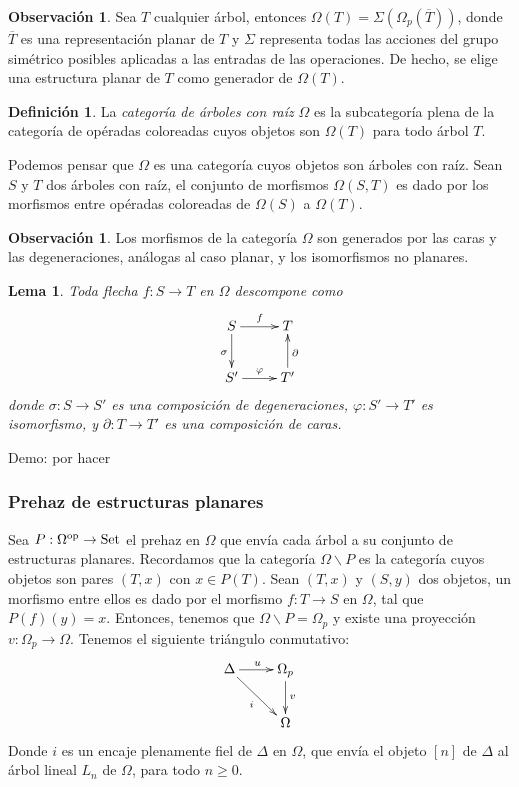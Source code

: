 \documentclass[11pt,a4paper,openright,oneside]{article}
\numberwithin{equation}{section}
\newtheorem{lema}[teo]{Lema}
\theoremstyle{definition}
\newtheorem{defi}[teo]{Definici\'on}
\newtheorem{obs}[teo]{Observaci\'on}
\newcommand{\Set}{\mathop{\rm Set}}
\begin{document}
\begin{obs}
    Sea $T$ cualquier \'arbol, entonces $\Omega(T) = \Sigma(\Omega_p(\overline{T}))$, donde $\overline{T}$ es una representaci\'on planar de $T$ y $\Sigma$ representa todas las acciones del grupo sim\'etrico posibles aplicadas a las entradas de las operaciones. De hecho, se elige una estructura planar de $T$ como generador de $\Omega(T)$.
\end{obs}
\begin{defi}
    La \emph{categor\'ia de \'arboles con ra\'iz} $\Omega$ es la subcategor\'ia plena de la categor\'ia de op\'eradas coloreadas cuyos objetos son $\Omega(T)$ para todo \'arbol $T$.

    Podemos pensar que $\Omega$ es una categor\'ia cuyos objetos son \'arboles con ra\'iz.
    Sean $S$ y $T$ dos \'arboles con ra\'iz, el conjunto de morfismos $\Omega(S, T)$ es dado por los morfismos entre op\'eradas coloreadas de $\Omega(S)$ a $\Omega(T)$.
\end{defi}
\begin{obs}
    Los morfismos de la categor\'ia $\Omega$ son generados por las caras y las degeneraciones, an\'alogas al caso planar, y los isomorfismos no planares.
\end{obs}
\begin{lema}
    Toda flecha $f\colon S \to T$ en $\Omega$ descompone como
    $$
        \xymatrix{
            S \ar[d]_{\sigma} \ar[r]^f
            &T \\
            S' \ar[r]^\varphi
            &T' \ar[u]_\partial
        }
    $$
    donde  $\sigma\colon S\to S'$ es una composici\'on de degeneraciones, $\varphi\colon S'\to T'$ es isomorfismo, y $\partial\colon T\to T'$ es una composici\'on de caras.
\end{lema}
Demo: por hacer

\subsubsection{Prehaz de estructuras planares}
Sea $P:\Omega^{\rm op} \to \Set$ el prehaz en $\Omega$ que env\'ia cada \'arbol a su conjunto de estructuras planares.
Recordamos que la categor\'ia $\Omega\backslash P$ es la categor\'ia cuyos objetos son pares $(T,x)$ con $x\in P(T)$. Sean $(T,x)$ y $(S,y)$ dos objetos, un morfismo entre ellos es dado por el morfismo $f\colon T\to S$ en $\Omega$, tal que $P(f)(y) = x$.
Entonces, tenemos que $\Omega\backslash P = \Omega_p$ y existe una proyecci\'on $v\colon\Omega_p\to\Omega$. Tenemos el siguiente tri\'angulo conmutativo:
$$
    \xymatrix{
        \Delta \ar[rd]_{i} \ar[r]^u
        &\Omega_p \ar[d]^v\\
        &\Omega
    }
$$
Donde $i$ es un encaje plenamente fiel de $\Delta$ en $\Omega$, que env\'ia el objeto $[n]$ de $\Delta$ al \'arbol lineal $L_n$ de $\Omega$, para todo $n\ge 0$.
\end{document}
